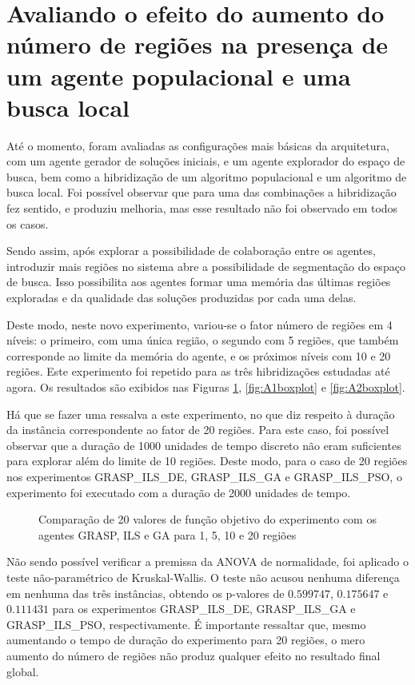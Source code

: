 \section{Avaliando o efeito do aumento do número de regiões na presença de um agente populacional e uma busca local}
\label{sec:aumentandoRegioes}

Até o momento, foram avaliadas as configurações mais básicas da arquitetura, com um agente gerador de soluções iniciais, e um agente explorador do espaço de busca, bem como a hibridização de um algoritmo populacional e um algoritmo de busca local. Foi possível observar que para uma das combinações a hibridização fez sentido, e produziu melhoria, mas esse resultado não foi observado em todos os casos. 

Sendo assim, após explorar a possibilidade de colaboração entre os agentes, introduzir mais regiões no sistema abre a possibilidade de segmentação do espaço de busca. Isso possibilita aos agentes formar uma memória das últimas regiões exploradas e da qualidade das soluções produzidas por cada uma delas. 

Deste modo, neste novo experimento, variou-se o fator número de regiões em 4 níveis: o primeiro, com uma única região, o segundo com 5 regiões, que também corresponde ao limite da memória do agente, e os próximos níveis com 10 e 20 regiões. Este experimento foi repetido para as três hibridizações estudadas até agora. Os resultados são exibidos nas Figuras \ref{fig:A0boxplot}, \ref{fig:A1boxplot} e \ref{fig:A2boxplot}. 

Há que se fazer uma ressalva a este experimento, no que diz respeito à duração da instância correspondente ao fator de 20 regiões. Para este caso, foi possível observar que a duração de 1000 unidades de tempo discreto não eram suficientes para explorar além do limite de 10 regiões. Deste modo, para o caso de 20 regiões nos experimentos GRASP\_ILS\_DE,  GRASP\_ILS\_GA e GRASP\_ILS\_PSO, o experimento foi executado com a duração de 2000 unidades de tempo. 

\begin{figure}
    \centering
    \caption{Comparação de 20 valores de função objetivo do experimento com os agentes GRASP, ILS e GA para 1, 5, 10 e 20 regiões}
    
    \label{fig:A0boxplot}
\end{figure}

Não sendo possível verificar a premissa da ANOVA de normalidade, foi aplicado o teste não-paramétrico de Kruskal-Wallis. O teste não acusou nenhuma diferença em nenhuma das três instâncias, obtendo os p-valores de $0.599747$, $0.175647$ e $0.111431$ para os experimentos GRASP\_ILS\_DE, GRASP\_ILS\_GA e GRASP\_ILS\_PSO, respectivamente. É importante ressaltar que, mesmo aumentando o tempo de duração do experimento para 20 regiões, o mero aumento do número de regiões não produz qualquer efeito no resultado final global. 

